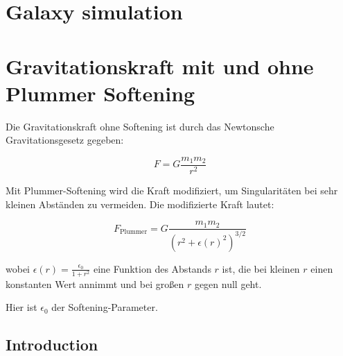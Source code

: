 \documentclass[10pt]{article}
\begin{document}
\onehalfspacing%

\section*{Galaxy simulation}
\section*{Gravitationskraft mit und ohne Plummer Softening}

Die Gravitationskraft ohne Softening ist durch das Newtonsche Gravitationsgesetz gegeben:

\begin{equation}
F = G \frac{m_1 m_2}{r^2}
\end{equation}

Mit Plummer-Softening wird die Kraft modifiziert, um Singularitäten bei sehr kleinen Abständen zu vermeiden. Die modifizierte Kraft lautet:

\begin{equation}
F_{\text{Plummer}} = G \frac{m_1 m_2}{(r^2 + \epsilon(r)^2)^{3/2}}
\end{equation}

wobei \(\epsilon(r) = \frac{\epsilon_0}{1 + r^2}\) eine Funktion des Abstands \(r\) ist, die bei kleinen \(r\) einen konstanten Wert annimmt und bei großen \(r\) gegen null geht.

Hier ist $\epsilon_0$ der Softening-Parameter.

\begin{center}
\end{center}

\subsection*{Introduction}
\end{document}
